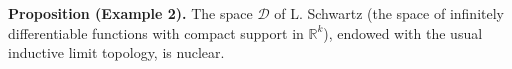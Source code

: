 \textbf{Proposition (Example 2).} The space $\mathcal{D}$ of L. Schwartz (the space of infinitely differentiable functions with compact support in $\mathbb{R}^k$), endowed with the usual inductive limit topology, is nuclear.
